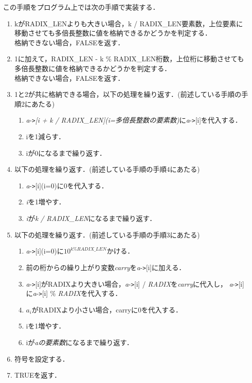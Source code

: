 \documentclass[a4paper,11pt,dvipdfmx]{jsarticle}
\begin{document}
この手順をプログラム上では次の手順で実装する．
\begin{enumerate}
  \item kがRADIX\_LENよりも大きい場合，k / RADIX\_LEN要素数，上位要素に移動させても多倍長整数に値を格納できるかどうかを判定する．\\
  格納できない場合，FALSEを返す．
  \item 1に加えて，RADIX\_LEN - k \% RADIX\_LEN桁数，上位桁に移動させても多倍長整数に値を格納できるかどうかを判定する．\\
  格納できない場合，FALSEを返す．
  \item 1と2が共に格納できる場合，以下の処理を繰り返す．(前述している手順の手順2にあたる)
  \begin{enumerate}
    \item \textit{a}-\verb|>|\textit{[i + k / RADIX\_LEN](i=多倍長整数の要素数)}に\textit{a}-\verb|>|[i]を代入する．
    \item iを1減らす．
    \item iが0になるまで繰り返す．
  \end{enumerate}
    \item 以下の処理を繰り返す．(前述している手順の手順4にあたる)
    \begin{enumerate}
  \item \textit{a}-\verb|>|[i](i=0)に0を代入する．
  \item \textit{i}を1増やす．
  \item \textit{i}が\textit{k / RADIX\_LEN}になるまで繰り返す．
\end{enumerate}
\item 以下の処理を繰り返す．(前述している手順の手順3にあたる)
  \begin{enumerate}
    \item \textit{a}-\verb|>|[i](i=0)に$10^{k \% RADIX\_LEN}$かける．
    \item 前の桁からの繰り上がり変数\textit{carry}を\textit{a}-\verb|>|[i]に加える．
    \item \textit{a}-\verb|>|[i]がRADIXより大きい場合，\textit{a}-\verb|>|[i] / \textit{RADIX}を\textit{carry}に代入し，
    \textit{a}-\verb|>|[i]に\textit{a}-\verb|>|[i] \% \textit{RADIX}を代入する．
    \item $a_i$がRADIXより小さい場合，carryに0を代入する．
    \item iを1増やす．
    \item iが\textit{aの要素数}になるまで繰り返す．
  \end{enumerate}
  \item 符号を設定する．
  \item TRUEを返す．
\end{enumerate}
\end{document}

